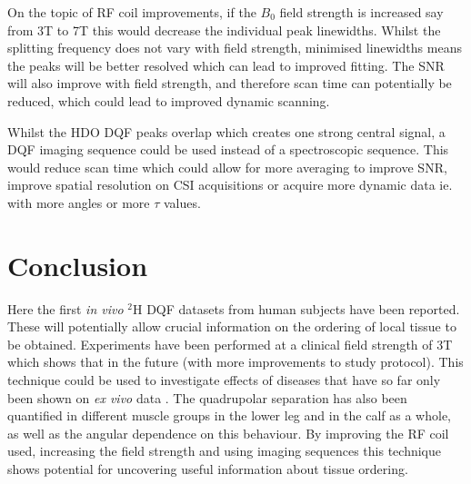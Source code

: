 On the topic of \ac{RF} coil improvements, if the $B_0$ field strength is increased say from 3T to 7T this would decrease the individual peak linewidths. Whilst the splitting frequency does not vary with field strength, minimised linewidths means the peaks will be better resolved which can lead to improved fitting. The \ac{SNR} will also improve with field strength, and therefore scan time can potentially be reduced, which could lead to improved dynamic scanning.

Whilst the \ac{HDO} \ac{DQF} peaks overlap which creates one strong central signal, a \ac{DQF} imaging sequence could be used instead of a spectroscopic sequence. This would reduce scan time which could allow for more averaging to improve \ac{SNR}, improve spatial resolution on \ac{CSI} acquisitions or acquire more dynamic data ie. with more angles or more $\tau$ values.

\section{Conclusion}

Here the first \textit{in vivo} $^2$H \ac{DQF} datasets from human subjects have been reported. These will potentially allow crucial information on the ordering of local tissue to be obtained. Experiments have been performed at a clinical field strength of 3T which shows that in the future (with more improvements to study protocol). This technique could be used to investigate effects of diseases that have so far only been shown on \textit{ex vivo} data \cite{Ooms2015DoubleTissue, Sharf1995DetectionNMR-Spectroscopy, Perea20072HDisc, Sun2010InvestigationNMR}. The quadrupolar separation has also been quantified in different muscle groups in the lower leg and in the calf as a whole, as well as the angular dependence on this behaviour. By improving the \ac{RF} coil used, increasing the field strength and using imaging sequences this technique shows potential for uncovering useful information about tissue ordering.


% 